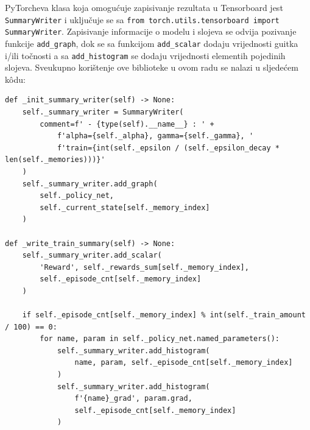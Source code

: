 PyTorcheva klasa koja omogućuje zapisivanje rezultata u Tensorboard jest \lstinline$SummaryWriter$ i uključuje se sa \lstinline$from torch.utils.tensorboard import SummaryWriter$. Zapisivanje informacije o modelu i slojeva se odvija pozivanje funkcije \lstinline$add_graph$, dok se sa funkcijom \lstinline$add_scalar$ dodaju vrijednosti guitka i/ili točnosti a sa \lstinline$add_histogram$ se dodaju vrijednosti elementih pojedinih slojeva. Sveukupno korištenje ove biblioteke u ovom radu se nalazi u sljedećem k\^odu:
\newpage
\begin{lstlisting}
def _init_summary_writer(self) -> None:
	self._summary_writer = SummaryWriter(
		comment=f' - {type(self).__name__} : ' +
			f'alpha={self._alpha}, gamma={self._gamma}, '
			f'train={int(self._epsilon / (self._epsilon_decay * len(self._memories)))}'
	)
	self._summary_writer.add_graph(
		self._policy_net, 
		self._current_state[self._memory_index]
	)

def _write_train_summary(self) -> None:
	self._summary_writer.add_scalar(
		'Reward', self._rewards_sum[self._memory_index],
		self._episode_cnt[self._memory_index]
	)

	if self._episode_cnt[self._memory_index] % int(self._train_amount / 100) == 0:
		for name, param in self._policy_net.named_parameters():
			self._summary_writer.add_histogram(
				name, param, self._episode_cnt[self._memory_index]
			)
			self._summary_writer.add_histogram(
				f'{name}_grad', param.grad, 
				self._episode_cnt[self._memory_index]
			)

\end{lstlisting}